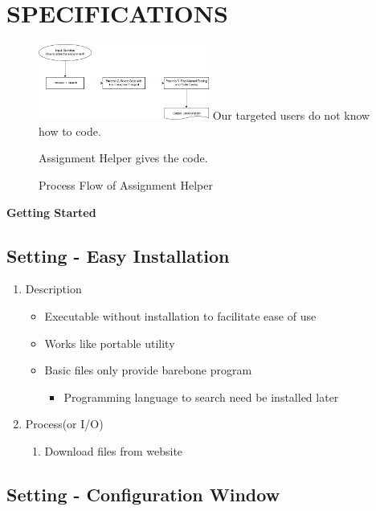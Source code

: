 \documentclass[conference]{IEEEtran}
\begin{document}
\section{SPECIFICATIONS} %
\label{sec:specifications}

\begin{figure}[h]
\centering
\includegraphics[width=0.5\textwidth]{./figures/Process_Flow.png}
Our targeted users do not know how to code.

Assignment Helper gives the code.
\caption{Process Flow of Assignment Helper}
\label{fig_process_flow}
\end{figure}


\textbf{Getting Started}

\subsection{Setting - Easy Installation}

\begin{enumerate}
  \item Description
  \begin{itemize}
    \item Executable without installation to facilitate ease of use
    \item Works like portable utility
    \item Basic files only provide barebone program
    \begin{itemize}
      \item Programming language to search need be installed later
    \end{itemize}
  \end{itemize}
  \item Process(or I/O)
  \begin{enumerate}
    \item Download files from website
  \end{enumerate}
\end{enumerate}
\textit{}


\subsection{Setting - Configuration Window}
\end{document}
